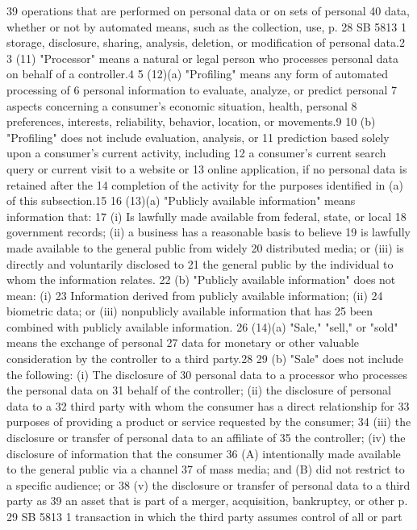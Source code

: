 39 operations that are performed on personal data or on sets of personal
40 data, whether or not by automated means, such as the collection, use,
p. 28 SB 5813
1 storage, disclosure, sharing, analysis, deletion, or modification of
personal data.2
3 (11) "Processor" means a natural or legal person who processes
personal data on behalf of a controller.4
5 (12)(a) "Profiling" means any form of automated processing of
6 personal information to evaluate, analyze, or predict personal
7 aspects concerning a consumer's economic situation, health, personal
8 preferences, interests, reliability, behavior, location, or
movements.9
10 (b) "Profiling" does not include evaluation, analysis, or
11 prediction based solely upon a consumer's current activity, including
12 a consumer's current search query or current visit to a website or
13 online application, if no personal data is retained after the
14 completion of the activity for the purposes identified in (a) of this
subsection.15
16 (13)(a) "Publicly available information" means information that:
17 (i) Is lawfully made available from federal, state, or local
18 government records; (ii) a business has a reasonable basis to believe
19 is lawfully made available to the general public from widely
20 distributed media; or (iii) is directly and voluntarily disclosed to
21 the general public by the individual to whom the information relates.
22 (b) "Publicly available information" does not mean: (i)
23 Information derived from publicly available information; (ii)
24 biometric data; or (iii) nonpublicly available information that has
25 been combined with publicly available information.
26 (14)(a) "Sale," "sell," or "sold" means the exchange of personal
27 data for monetary or other valuable consideration by the controller
to a third party.28
29 (b) "Sale" does not include the following: (i) The disclosure of
30 personal data to a processor who processes the personal data on
31 behalf of the controller; (ii) the disclosure of personal data to a
32 third party with whom the consumer has a direct relationship for
33 purposes of providing a product or service requested by the consumer;
34 (iii) the disclosure or transfer of personal data to an affiliate of
35 the controller; (iv) the disclosure of information that the consumer
36 (A) intentionally made available to the general public via a channel
37 of mass media; and (B) did not restrict to a specific audience; or
38 (v) the disclosure or transfer of personal data to a third party as
39 an asset that is part of a merger, acquisition, bankruptcy, or other
p. 29 SB 5813
1 transaction in which the third party assumes control of all or part
